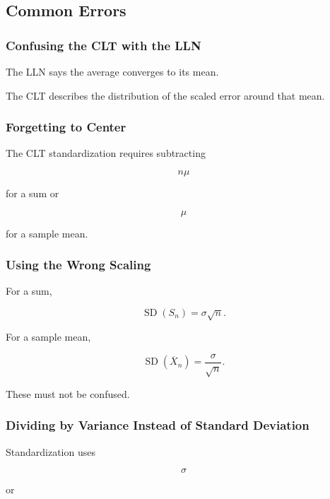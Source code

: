 \subsection{Common Errors}
\label{subsec:clt-common-errors}

\subsubsection{Confusing the CLT with the LLN}

The LLN says the average converges to its mean.

The CLT describes the distribution of the scaled error around that mean.

\subsubsection{Forgetting to Center}

The CLT standardization requires subtracting

\[
n\mu
\]

for a sum or

\[
\mu
\]

for a sample mean.

\subsubsection{Using the Wrong Scaling}

For a sum,

\[
\operatorname{SD}(S_n)
=
\sigma\sqrt{n}.
\]

For a sample mean,

\[
\operatorname{SD}(\overline{X}_n)
=
\frac{\sigma}{\sqrt{n}}.
\]

These must not be confused.

\subsubsection{Dividing by Variance Instead of Standard Deviation}

Standardization uses

\[
\sigma
\]

or

